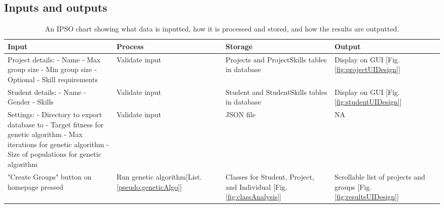 \documentclass{article}
\begin{document}
\subsection{Inputs and outputs}
\begin{longtable}[c]{|m{0.25\linewidth}|m{0.25\linewidth}|m{0.25\linewidth}|m{0.25\linewidth}|}
    \caption{An IPSO chart showing what data is inputted, how it is processed and stored, and how the results are outputted.} \label{tab:IPSO} \\
    \hline
    Input&Process&Storage&Output\\
    \hline
    Project details:\newline
    - Name\newline
    - Max group size\newline
    - Min group size\newline
    - Optional\newline
    - Skill requirements
    &Validate input&Projects and ProjectSkills tables in database&Display on GUI [Fig. \ref{fig:projectUIDesign}]\\
    \hline
    Student details:\newline
    - Name \newline
    - Gender \newline
    - Skills
    &Validate input&Student and StudentSkills tables in database&Display on GUI [Fig. \ref{fig:studentUIDesign}]\\
    \hline
    Settings:\newline
    - Directory to export database to\newline
    - Target fitness for genetic algorithm\newline
    - Max iterations for genetic algorithm\newline
    - Size of populations for genetic algorithm
    &Validate input&JSON file&NA\\
    \hline
    "Create Groups" button on homepage pressed&Run genetic algorithm[List. \ref{pseudo:geneticAlgo}]&Classes for Student, Project, and Individual [Fig. \ref{fig:classAnalysis}]&Scrollable list of projects and groups [Fig. \ref{fig:resultsUIDesign}]\\
    \hline

\end{longtable}
\end{document}
